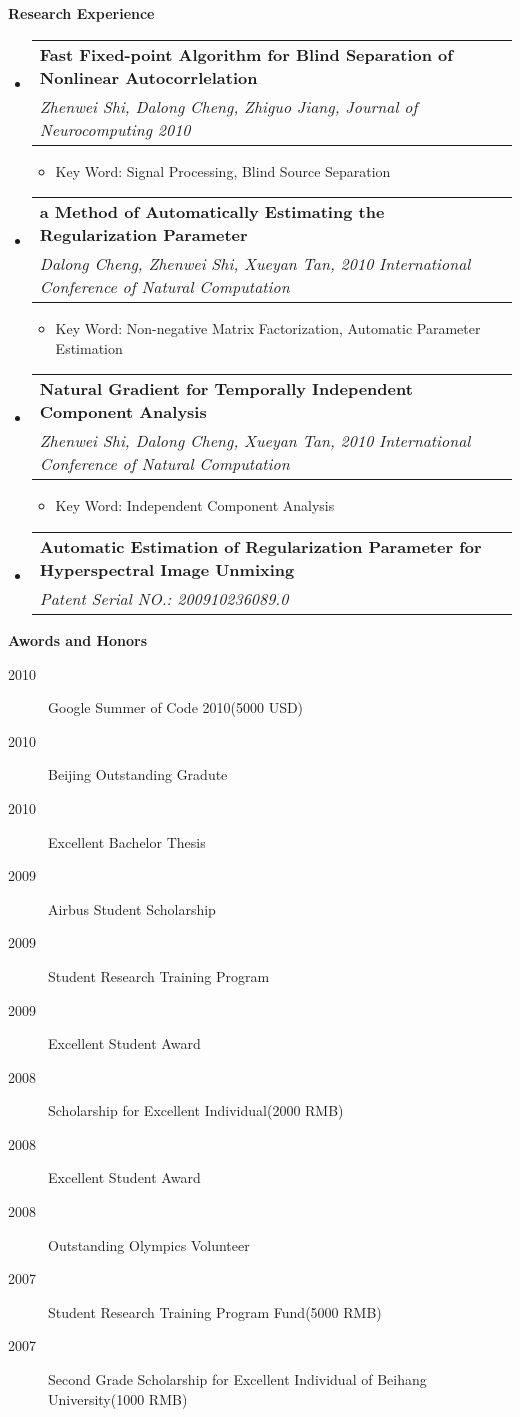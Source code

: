 \documentclass[letterpaper,11pt]{article}
\makeatletter
\newcommand{\resitem}[1]{\item #1 \vspace{-2pt}}
\newcommand{\resheading}[1]{{\large \colorbox{mygrey}{\begin{minipage}{\textwidth}{\textbf{#1 \vphantom{p\^{E}}}}\end{minipage}}}}
\newcommand{\ressubheading}[4]{
\begin{tabular*}{6.5in}{l@{\extracolsep{\fill}}r}
		\textbf{#1} & #2 \\
		\textit{#3} & \textit{#4} \\
\end{tabular*}\vspace{-6pt}}
\makeatother
\begin{document}
\resheading{Research Experience}
	\begin{itemize}
		\item 
			\ressubheading{Fast Fixed-point Algorithm for Blind Separation of Nonlinear Autocorrlelation}{}{Zhenwei Shi, Dalong Cheng, Zhiguo Jiang, Journal of Neurocomputing 2010}{}
            { \footnotesize
				\begin{itemize}
					\resitem{Key Word: Signal Processing, Blind Source Separation}
				\end{itemize}
			}
		\item
			\ressubheading{a Method of Automatically Estimating the Regularization Parameter
}{}{Dalong Cheng, Zhenwei Shi, Xueyan Tan, 2010 International Conference of Natural Computation}{}
				{ \footnotesize
				\begin{itemize}
					\resitem{Key Word: Non-negative Matrix Factorization, Automatic Parameter Estimation}
				\end{itemize}
          		}
		\item 
			\ressubheading{Natural Gradient for Temporally Independent Component Analysis}{}{Zhenwei Shi, Dalong Cheng, Xueyan Tan, 2010 International Conference of Natural Computation}{}
				{ \footnotesize
				\begin{itemize}
					\resitem{Key Word: Independent Component Analysis}
				\end{itemize}
				}

		\item 
			\ressubheading{Automatic Estimation of Regularization Parameter for Hyperspectral Image Unmixing
}{}{Patent Serial NO.: 200910236089.0}{}

	\end{itemize}  %

\resheading{{Awords and Honors}}
	\begin{description}
        \item[2010] {Google Summer of Code 2010(5000 USD)}
        \item[2010] {Beijing Outstanding Gradute}
	    \item[2010] {Excellent Bachelor Thesis}
        \item[2009] {Airbus Student Scholarship}
        \item[2009] {Student Research Training Program}
        \item[2009] {Excellent Student Award}
        \item[2008] {Scholarship for Excellent Individual(2000 RMB)}
        \item[2008] {Excellent Student Award}
        \item[2008] {Outstanding Olympics Volunteer}
        \item[2007] {Student Research Training Program Fund(5000 RMB)}
        \item[2007] {Second Grade Scholarship for Excellent Individual of Beihang University(1000 RMB)}
	
	\end{description}
    
\end{document}
